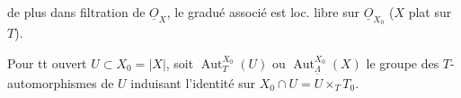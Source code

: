 de plus dans  filtration  de $\underline{O}_X$,  le gradué associé est loc. libre sur $\underline{O}_{X_0}$ ($X$ plat sur $T$).

 Pour tt ouvert $U\subset X_0=|X|$, soit $\operatorname{Aut}^{X_0}_{T}(U)$ ou $\operatorname{Aut}^{X_0}_{\underline{\Lambda}}(X)$ le groupe des $T$-automorphismes de $U$ induisant l'identité sur $X_0\cap U=U\times_T T_0$.


